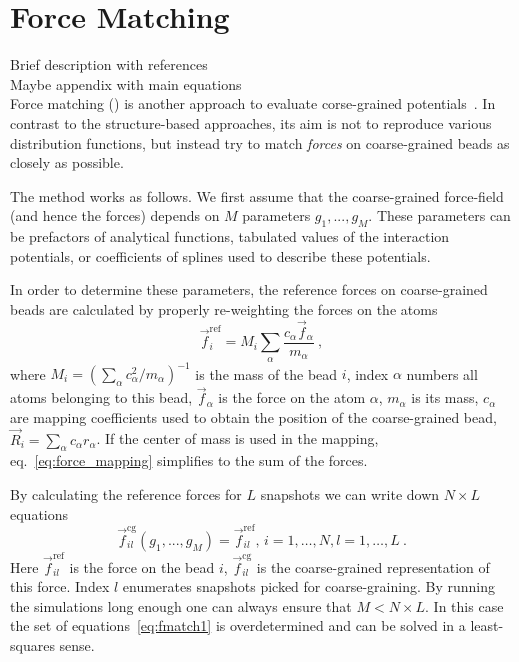 \section{Force Matching}
\sasha

Brief description with references \\
Maybe appendix with main equations \\

Force matching (\fm) is another approach to evaluate corse-grained potentials~\cite{Ercolessi:1994,Izvekov:2005,Noid:2007}. In contrast to the structure-based approaches, its aim is not to reproduce various distribution functions, but instead try to match {\em forces} on coarse-grained beads as closely as possible.

The method works as follows. We first assume that the coarse-grained force-field (and hence the forces) depends on $M$ parameters $g_1,...,g_M $. These parameters can be prefactors of analytical functions, tabulated values of the interaction potentials, or coefficients of splines used to describe these potentials.

In order to determine these parameters, the reference forces on coarse-grained beads are  calculated by properly re-weighting the forces on the atoms
\begin{equation}
  {\vec f}_i^\text{ref} = M_{i} \sum_\alpha \frac{c_\alpha {\vec f}_\alpha}{m_\alpha}~,
  \label{eq:force_mapping}
\end{equation}
where $M_{i} = \left( \sum_\alpha c^{2}_{\alpha} / m_\alpha \right)^{-1}$ is the mass of the bead $i$, index $\alpha$ numbers all atoms belonging to this bead, ${\vec f}_\alpha$ is the force on the atom $\alpha$, $m_\alpha$ is its mass, $c_\alpha$ are mapping coefficients used to obtain the position of the coarse-grained bead, ${\vec R}_i = \sum_\alpha c_\alpha r_\alpha$. If the center of mass is used in the mapping, eq.~\ref{eq:force_mapping} simplifies to the sum of the forces.

By calculating the reference forces for $L$ snapshots we can write down $N \times L$ equations
%
\begin{equation}
  {\vec f}_{il}^\text{cg}(g_1,...,g_M)=\vec f_{il}^\text{ref},\, i=1,\dots,N, l=1,\dots,L~.
  \label{eq:fmatch1}
\end{equation}
%
Here ${\vec f}_{il}^\text{ref}$ is the force on the bead $i$, ${\vec f}_{il}^\text{cg} $ is the coarse-grained representation of this force. Index $l$ enumerates snapshots picked for coarse-graining. By running the simulations long enough one can always ensure that $M < N \times L$. In this case the set of equations~\ref{eq:fmatch1} is overdetermined and can be solved in a least-squares sense.

